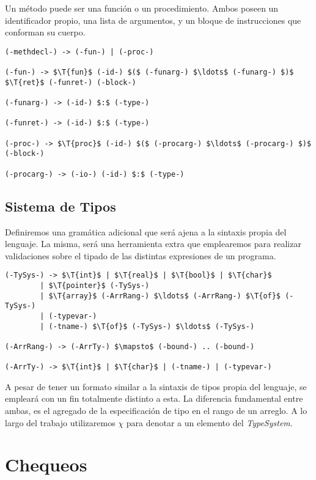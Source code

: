 \documentclass{article}
\begin{document}
Un método puede ser una función o un procedimiento.
Ambos poseen un identificador propio, una lista de argumentos, y un bloque de instrucciones que conforman su cuerpo.

\begin{lstlisting}[style = syntax]
(-methdecl-) -> (-fun-) | (-proc-)

(-fun-) -> $\T{fun}$ (-id-) $($ (-funarg-) $\ldots$ (-funarg-) $)$ $\T{ret}$ (-funret-) (-block-)

(-funarg-) -> (-id-) $:$ (-type-)

(-funret-) -> (-id-) $:$ (-type-)

(-proc-) -> $\T{proc}$ (-id-) $($ (-procarg-) $\ldots$ (-procarg-) $)$ (-block-)

(-procarg-) -> (-io-) (-id-) $:$ (-type-)
\end{lstlisting}

\subsection{Sistema de Tipos}

Definiremos una gramática adicional que será ajena a la sintaxis propia del lenguaje.
La misma, será una herramienta extra que emplearemos para realizar validaciones sobre el tipado de las distintas expresiones de un programa.

\begin{lstlisting}[style = syntax]
(-TySys-) -> $\T{int}$ | $\T{real}$ | $\T{bool}$ | $\T{char}$
        | $\T{pointer}$ (-TySys-)
        | $\T{array}$ (-ArrRang-) $\ldots$ (-ArrRang-) $\T{of}$ (-TySys-)
        | (-typevar-)
        | (-tname-) $\T{of}$ (-TySys-) $\ldots$ (-TySys-)
             
(-ArrRang-) -> (-ArrTy-) $\mapsto$ (-bound-) .. (-bound-)

(-ArrTy-) -> $\T{int}$ | $\T{char}$ | (-tname-) | (-typevar-)
\end{lstlisting}

A pesar de tener un formato similar a la sintaxis de tipos propia del lenguaje, se empleará con un fin totalmente distinto a esta.
La diferencia fundamental entre ambas, es el agregado de la especificación de tipo en el rango de un arreglo.
A lo largo del trabajo utilizaremos $\chi$ para denotar a un elemento del \textit{TypeSystem}.

\section{Chequeos}
\end{document}
